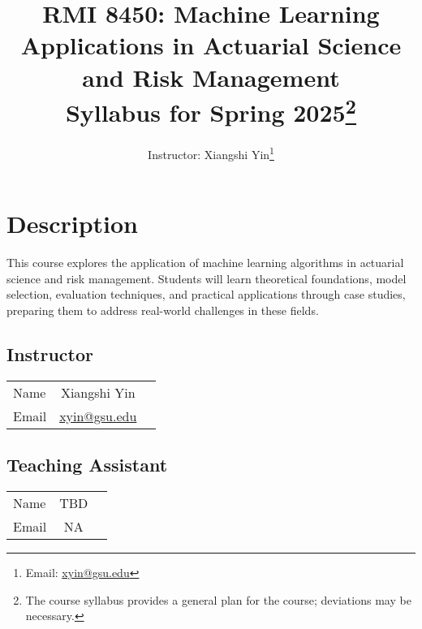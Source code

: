 \documentclass[a4paper, 12pt]{article}
\title{
    RMI 8450: Machine Learning Applications in Actuarial Science and Risk Management\\
    \large Syllabus for Spring 2025\footnote{The course syllabus provides a general plan for the course; deviations may be necessary.}
}
\author{Instructor: Xiangshi Yin\thanks{Email: \href{mailto:xyin@gsu.edu}{xyin@gsu.edu}}}
\begin{document}
\maketitle

\tableofcontents

\section{Description}
This course explores the application of machine learning algorithms in actuarial science and risk management. Students will learn theoretical foundations, model selection, evaluation techniques, and practical applications through case studies, preparing them to address real-world challenges in these fields.

\subsection{Instructor}
\begin{center}
  \begin{tabular}{ l | c r }
    \hline			
    Name & Xiangshi Yin\\
    Email & \href{mailto:xyin@gsu.edu}{xyin@gsu.edu}\\
    \hline  
  \end{tabular}
\end{center}

\subsection{Teaching Assistant}
\begin{center}
	\begin{tabular}{ l | c r }
		\hline			
		Name & TBD\\
		Email & NA\\
		\hline  
	\end{tabular}
\end{center}
\end{document}
